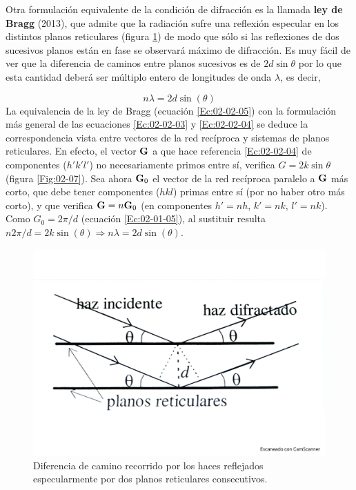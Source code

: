 Otra formulación equivalente de la condición de difracción es la llamada \textbf{ley de Bragg} (2013), que admite que la radiación sufre una reflexión especular en los distintos planos reticulares (figura \ref{Fig:02-06}) de modo que sólo si las reflexiones de dos sucesivos planos están en fase se observará máximo de difracción. Es muy fácil de ver que la diferencia de caminos entre planos sucesivos es de $2d\sin \theta$ por lo que esta cantidad deberá ser múltiplo entero de longitudes de onda $\lambda$, es decir,

\begin{equation}
    n \lambda = 2 d \sin (\theta) \label{Ec:02-02-05}
\end{equation}
La equivalencia de la ley de Bragg (ecuación \ref{Ec:02-02-05}) con la formulación más general de las ecuaciones \ref{Ec:02-02-03} y \ref{Ec:02-02-04} se deduce la correspondencia vista entre vectores de la red recíproca y sistemas de planos reticulares. En efecto, el vector $\mathbf{G}$ a que hace referencia \ref{Ec:02-02-04} de componentes ($h' k' l'$) no necesariamente primos entre sí, verifica $G=2k\sin \theta$ (figura \ref{Fig:02-07}). Sea ahora $\mathbf{G}_0$ el vector de la red recíproca paralelo a $\mathbf{G}$ más corto, que debe tener componentes ($hkl$) primas entre sí (por no haber otro más corto), y que verifica $\mathbf{G} = n \mathbf{G}_0$ (en componentes $h'=nh$, $k'=nk$, $l'=nk$). Como $G_0 = 2\pi/d$ (ecuación \ref{Ec:02-01-05}), al sustituir resulta $n2\pi/d=2k\sin (\theta) \Rightarrow n \lambda = 2 d \sin (\theta)$. 

\begin{figure}[h!] \centering
    \includegraphics[scale=0.35]{Cuerpo/Ch_02/Fotos_libro 6.pdf}
    \caption{Diferencia de camino recorrido por los haces reflejados especularmente por dos planos reticulares consecutivos.}
    \label{Fig:02-06}
\end{figure}
    
